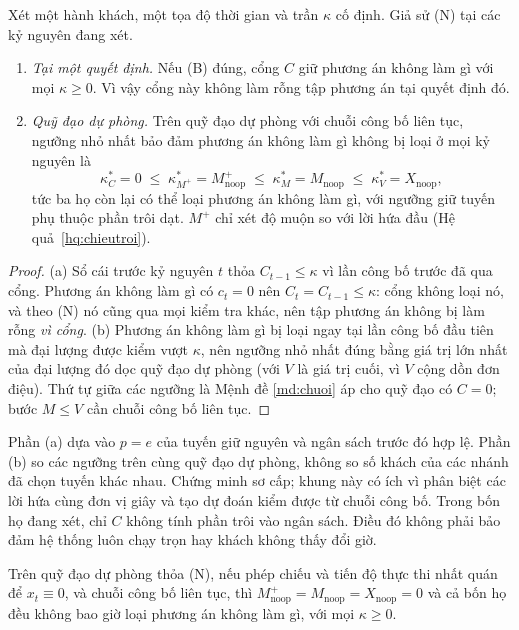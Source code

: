 \begin{dinhly}
\label{dl:hocong}
Xét một hành khách, một tọa độ thời gian và trần $\kappa$ cố định. Giả sử (N) tại các
kỷ nguyên đang xét.
\begin{enumerate}[label=(\alph*),leftmargin=1cm,itemsep=2pt,topsep=3pt]
\item \emph{Tại một quyết định.} Nếu (B) đúng, cổng $C$ giữ phương án không làm gì với mọi
$\kappa\ge0$. Vì vậy cổng này không làm rỗng tập phương án tại quyết định đó.
\item \emph{Quỹ đạo dự phòng.} Trên quỹ đạo dự phòng với chuỗi công bố liên tục, ngưỡng nhỏ nhất
bảo đảm phương án không làm gì không bị loại ở mọi kỷ nguyên là
\[
\kappa^{*}_{C} = 0 \;\le\; \kappa^{*}_{M^{+}} = M^{+}_{\text{noop}} \;\le\;
\kappa^{*}_{M} = M_{\text{noop}} \;\le\; \kappa^{*}_{V} = X_{\text{noop}} ,
\]
tức ba họ còn lại có thể loại phương án không làm gì, với ngưỡng giữ tuyến phụ thuộc phần
trôi dạt. $M^{+}$ chỉ xét độ muộn so với lời hứa đầu (Hệ quả~\ref{hq:chieutroi}).
\end{enumerate}
\end{dinhly}

\begin{proof}
(a) Sổ cái trước kỷ nguyên $t$ thỏa $C_{t-1} \le \kappa$ vì lần công bố trước đã qua cổng. Phương
án không làm gì có $c_t = 0$ nên $C_t = C_{t-1} \le \kappa$: cổng không loại nó, và theo (N) nó
cũng qua mọi kiểm tra khác, nên tập phương án không bị làm rỗng \emph{vì cổng}. (b) Phương án không
làm gì bị loại ngay tại lần công bố đầu tiên mà đại lượng được kiểm vượt $\kappa$, nên ngưỡng nhỏ
nhất đúng bằng giá trị lớn nhất của đại lượng đó dọc quỹ đạo dự phòng (với $V$ là giá trị cuối, vì
$V$ cộng dồn đơn điệu). Thứ tự giữa các ngưỡng là Mệnh đề \ref{md:chuoi} áp cho quỹ đạo có
$C = 0$; bước $M \le V$ cần chuỗi công bố liên tục.
\end{proof}

Phần (a) dựa vào $p=e$ của tuyến giữ nguyên và ngân sách trước đó hợp lệ. Phần (b) so các
ngưỡng trên cùng quỹ đạo dự phòng, không so số khách của các nhánh đã chọn tuyến khác nhau.
Chứng minh sơ cấp; khung này có ích vì phân biệt các lời hứa cùng đơn vị giây và tạo dự
đoán kiểm được từ chuỗi công bố. Trong bốn họ đang xét, chỉ $C$ không tính phần trôi vào
ngân sách. Điều đó không phải bảo đảm hệ thống luôn chạy trọn hay khách không thấy đổi giờ.

\begin{hequa}

Trên quỹ đạo dự phòng thỏa (N), nếu phép chiếu và tiến độ thực thi nhất quán để
$x_t\equiv0$, và chuỗi công bố liên tục, thì
$M^{+}_{\text{noop}} = M_{\text{noop}} = X_{\text{noop}} = 0$ và cả bốn họ đều không bao giờ loại
phương án không làm gì, với mọi $\kappa \ge 0$.
\end{hequa}


